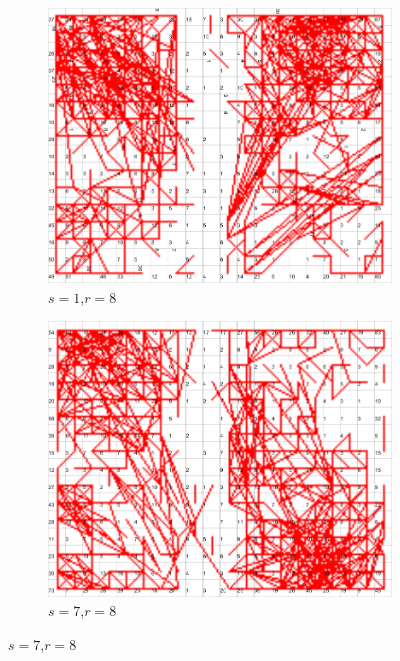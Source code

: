 \documentclass{acm_proc_article-sp}
\begin{document}
\begin{figure}
\centering
    \centering
    \begin{subfigure}[b]{0.30\linewidth}
        \includegraphics[width=\linewidth]{img/wine-newmid-radius-neighbourhood-graph--r-08-seed-1}
        \caption{$s=1$,$r=8$}
        \label{fig:wine-newmid-radius-neighbourhood-graph--r-08-seed-1}
    \end{subfigure}
    \begin{subfigure}[b]{0.30\linewidth}
        \includegraphics[width=\linewidth]{img/wine-newmid-radius-neighbourhood-graph--r-08-seed-7}
        \caption{$s=7$,$r=8$}

\end{subfigure}
\end{figure}
\end{document}
